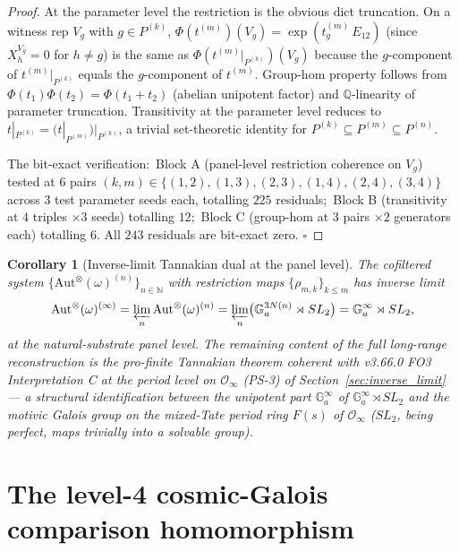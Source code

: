 \documentclass[11pt,a4paper]{article}
\theoremstyle{plain}
\newtheorem{corollary}[theorem]{Corollary}
\theoremstyle{definition}
\newcommand{\Ginf}{\mathcal{O}_{\infty}}
\newcommand{\Aut}{\mathrm{Aut}}
\newcommand{\Ga}{\mathbb{G}_{a}}
\newcommand{\Q}{\mathbb{Q}}
\newcommand{\N}{\mathbb{N}}
\newcommand{\Phimap}{\Phi}
\newcommand{\fibfun}{\omega}
\begin{document}
\begin{proof}
At the parameter level the restriction is the obvious dict
truncation. On a witness rep $V_{g}$ with $g \in P^{(k)}$,
$\Phimap(t^{(m)})(V_{g}) = \exp(t^{(m)}_{g}\, E_{12})$ (since
$X^{V_{g}}_{h} = 0$ for $h \ne g$) is the same as
$\Phimap(t^{(m)}\big|_{P^{(k)}})(V_{g})$ because the $g$-component of
$t^{(m)}\big|_{P^{(k)}}$ equals the $g$-component of $t^{(m)}$.
Group-hom property follows from $\Phimap(t_{1}) \Phimap(t_{2}) =
\Phimap(t_{1} + t_{2})$ (abelian unipotent factor) and
$\Q$-linearity of parameter truncation. Transitivity at the
parameter level reduces to
$t|_{P^{(k)}} = (t|_{P^{(m)}})|_{P^{(k)}}$, a trivial set-theoretic
identity for $P^{(k)} \subseteq P^{(m)} \subseteq P^{(n)}$.

The bit-exact verification:\ Block A (panel-level restriction
coherence on $V_{g}$) tested at $6$ pairs $(k, m) \in \{(1, 2),
(1, 3), (2, 3), (1, 4), (2, 4), (3, 4)\}$ across $3$ test
parameter seeds each, totalling $225$ residuals;\ Block B
(transitivity at $4$ triples $\times 3$ seeds) totalling $12$;\
Block C (group-hom at $3$ pairs $\times 2$ generators each)
totalling $6$. All $243$ residuals are bit-exact zero. $\square$
\end{proof}

\begin{corollary}[Inverse-limit Tannakian dual at the panel level]\label{cor:inverse_limit}
The cofiltered system $\{\Aut^{\otimes}(\fibfun)^{(n)}\}_{n \in \N}$
with restriction maps $\{\rho_{m, k}\}_{k \le m}$ has inverse limit
\[
\Aut^{\otimes}(\fibfun)^{(\infty)}
   = \varprojlim_{n} \Aut^{\otimes}(\fibfun)^{(n)}
   = \varprojlim_{n} \bigl(\Ga^{3 N(n)} \rtimes SL_{2}\bigr)
   = \Ga^{\infty} \rtimes SL_{2},
\]
at the natural-substrate panel level. The remaining content of the
full long-range reconstruction is the pro-finite Tannakian theorem
\cite{deligne1990,brown2012} coherent with v3.66.0 FO3
Interpretation C at the period level on $\Ginf$ (PS-3) of
Section~\ref{sec:inverse_limit} --- a structural identification between
the unipotent part $\Ga^{\infty}$ of $\Ga^{\infty} \rtimes SL_{2}$ and
the motivic Galois group on the mixed-Tate period ring $F(s)$ of
$\Ginf$ ($SL_{2}$, being perfect, maps trivially into a solvable
group).
\end{corollary}

\section{The level-4 cosmic-Galois comparison homomorphism}\label{sec:injection_g4}
\end{document}
